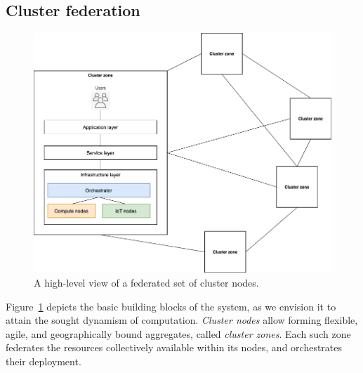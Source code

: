 

\subsection{Cluster federation}

\begin{figure}[ht]
\centering
\includegraphics[width=0.75\columnwidth]{figures/architecture-federation}
\caption{A high-level view of a federated set of cluster nodes.} \label{fig:architecture-federation}
\end{figure}

Figure~\ref{fig:architecture-federation} depicts
the basic building blocks of the system, as we envision it to attain the sought dynamism of computation.  
\textit{Cluster nodes} allow forming flexible, agile, and geographically bound aggregates, called \textit{cluster zones}.
Each such zone federates the resources collectively available within its nodes, and orchestrates their deployment. 

